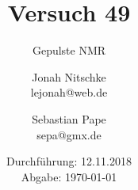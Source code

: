 

\title{Versuch 49}
\subtitle{Gepulste NMR}
\author{Jonah Nitschke\\
        lejonah@web.de \and
        Sebastian Pape\\
        sepa@gmx.de}
\date{Durchführung: 12.11.2018\\
      Abgabe: \today}



\maketitle
\newpage
\setcounter{page}{1}


\newpage


\printbibliography


